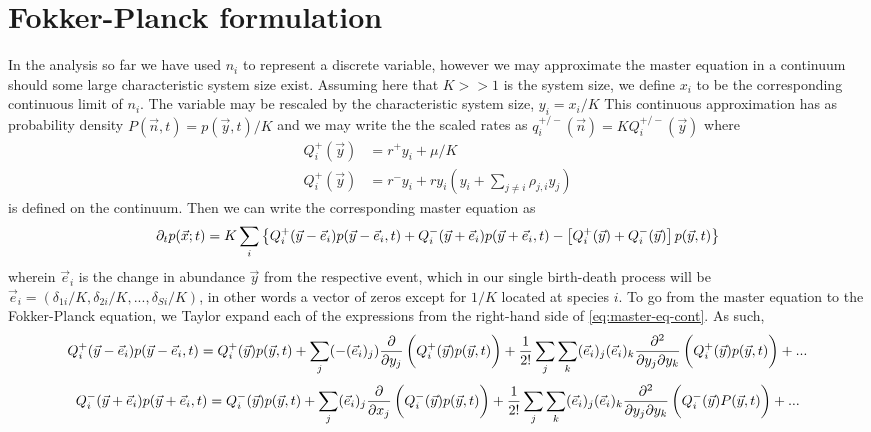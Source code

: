 \documentclass[9pt,twoside,lineno]{pnas-new}
\begin{document}
\section*{Fokker-Planck formulation}

In the analysis so far we have used $n_i$ to represent a discrete variable, however we may approximate the master equation in a continuum should some large characteristic system size exist.
Assuming here that $K >> 1$ is the system size, we define $x_i$ to be the corresponding continuous limit of $n_i$.
The variable may be rescaled by the characteristic system size, $y_i = x_i / K$
This continuous approximation has as probability density $ P(\vec{n},t) = p(\vec{y},t)/K$ and we may write the the scaled rates as $q_i^{+/-}(\vec{n})=K Q_i^{+/-}(\vec{y})$ where
\begin{align*}
    Q_i^{+}(\vec{y}) &= r^+ y_i + \mu / K \\
    Q_i^{+}(\vec{y}) &= r^- y_i + r y_i \left( y_i + \sum_{j\neq i}\rho_{j,i} y_j \right)
\end{align*}
is defined on the continuum.
Then we can write the corresponding master equation as
\begin{equation}
    \label{eq:master-eq-cont}
    \partial_t  p(\vec{x};t) =
    K \sum_{i}\left\{Q^+_i(\vec{y}-\vec{e}_i)p(\vec{y}-\vec{e}_i,t)+ 
    Q^-_i (\vec{y}+\vec{e}_i)p(\vec{y}+\vec{e}_i,t) - \left[Q^+_i(\vec{y})+Q^-_i(\vec{y})\right]p(\vec{y},t)\vphantom{\vec{e}_i} \right\}
\end{equation}
wherein $\vec{e}_i$ is the change in abundance $\vec{y}$ from the respective event, which in our single birth-death process will be $\vec{e}_i=(\delta_{1i}/K, \delta_{2i}/K, ..., \delta_{Si}/K)$, in other words a vector of zeros except for $1/K$ located at species $i$.
To go from the master equation to the Fokker-Planck equation, we Taylor expand each of the expressions from the right-hand side of \ref{eq:master-eq-cont}.
As such,
\begin{multline*}
    Q^+_i(\vec{y}-\vec{e}_i)p(\vec{y}-\vec{e}_i,t)= Q^+_i(\vec{y})p(\vec{y},t)+\sum_j (-(\vec{e}_i)_j) \frac{\partial}{\partial y_j}\left( Q^+_i(\vec{y})p(\vec{y},t)\vphantom{\frac{1}{1}}\right)
    + \frac{1}{2!}\sum_j \sum_k (\vec{e}_i)_j(\vec{e}_i)_k \frac{\partial^2}{\partial y_j \partial y_k}\left( Q^+_i(\vec{y})p(\vec{y},t)\vphantom{\frac{1}{1}}\right)+...
\end{multline*}
\begin{multline*}
    Q^-_i(\vec{y}+\vec{e}_i)p(\vec{y}+\vec{e}_i,t)= Q^-_i(\vec{y})p(\vec{y},t)+\sum_j (\vec{e}_i)_j \frac{\partial}{\partial x_j}\left( Q^-_i(\vec{y})p(\vec{y},t)\vphantom{\frac{1}{1}}\right)
    + \frac{1}{2!}\sum_j \sum_k (\vec{e}_i)_j (\vec{e}_i)_k \frac{\partial^2}{\partial y_j \partial y_k}\left( Q^-_i(\vec{y})P(\vec{y},t)\vphantom{\frac{1}{1}}\right)+...
\end{multline*}
\end{document}
